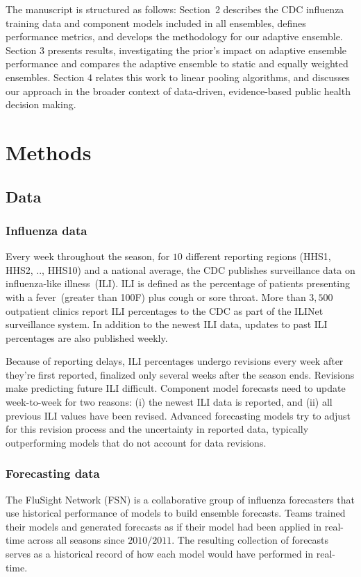 \documentclass[12pt]{article}
\begin{document}
The manuscript is structured as follows: Section~2 describes the CDC influenza training data and component models included in all ensembles, defines performance metrics, and develops the methodology for our adaptive ensemble. Section 3 presents results, investigating the prior's impact on adaptive ensemble performance and compares the adaptive ensemble to static and equally weighted ensembles. Section 4 relates this work to linear pooling algorithms, and discusses our approach in the broader context of data-driven, evidence-based public health decision making.

\section{Methods}

\subsection{Data}
\subsubsection{Influenza data}
Every week throughout the season, for $10$ different reporting regions (HHS1, HHS2, .., HHS10) and a national average, the CDC publishes surveillance data on influenza-like illness~(ILI).
ILI is defined as the percentage of patients presenting with a fever~(greater than 100F) plus cough or sore throat.
More than $3,500$ outpatient clinics report ILI percentages to the CDC as part of the ILINet surveillance system.
In addition to the newest ILI data, updates to past ILI percentages are also published weekly.

Because of reporting delays, ILI percentages undergo revisions every week after they're first reported, finalized only several weeks after the season ends.
Revisions make predicting future ILI difficult. Component model forecasts need to update week-to-week for two reasons: (i) the newest ILI data is reported, and (ii) all previous ILI values have been revised.
Advanced forecasting models try to adjust for this revision process and the uncertainty in reported data, typically outperforming models that do not account for data revisions.\cite{brooks2018nonmechanistic}

\subsubsection{Forecasting data}

The FluSight Network (FSN) is a collaborative group of influenza forecasters that use historical performance of models to build ensemble forecasts.
Teams trained their models and generated forecasts as if their model had been applied in real-time across all seasons since $2010/2011$.
The resulting collection of forecasts serves as a historical record of how each model would have performed in real-time.\cite{reich2019collaborativepnas}
\end{document}

